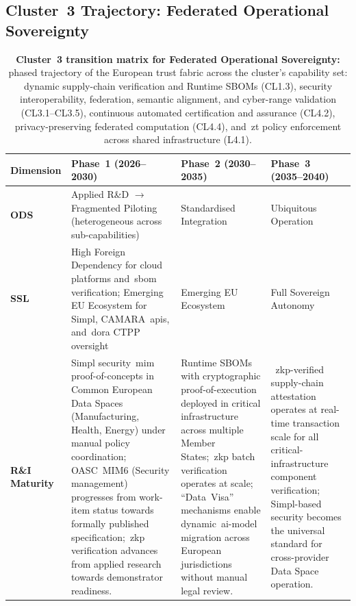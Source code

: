 \documentclass{ieeeaccess}
\begin{document}
\subsection{Cluster~3 Trajectory: Federated Operational Sovereignty}
\label{subsec:c3traj}

\begin{table}[ht!]
\caption{\textbf{Cluster~3 transition matrix for Federated Operational Sovereignty:} phased trajectory of the European trust fabric across the cluster's capability set: dynamic supply-chain verification and Runtime SBOMs (CL1.3), security interoperability, federation, semantic alignment, and cyber-range validation (CL3.1--CL3.5), continuous automated certification and assurance (CL4.2), privacy-preserving federated computation (CL4.4), and~\gls{zt} policy enforcement across shared infrastructure (L4.1).}
\label{tab:c3}
\centering
\footnotesize
\renewcommand{\arraystretch}{1.15}
\begin{tabularx}{\textwidth}{@{}>{\bfseries}p{} X X X@{}}
\toprule
\textbf{Dimension} & \textbf{Phase~1 (2026--2030)} & \textbf{Phase~2 (2030--2035)} & \textbf{Phase~3 (2035--2040)} \\
\midrule
ODS &
Applied R\&D $\rightarrow$ Fragmented Piloting (heterogeneous across sub-capabilities) &
Standardised Integration &
Ubiquitous Operation \\
\addlinespace[2pt]
SSL &
High Foreign Dependency for cloud platforms and~\gls{sbom} verification; Emerging EU Ecosystem for Simpl, CAMARA~\glspl{api}, and~\gls{dora} CTPP oversight &
Emerging EU Ecosystem &
Full Sovereign Autonomy \\
\midrule
R\&I Maturity &
Simpl security~\gls{mim} proof-of-concepts in Common European Data Spaces (Manufacturing, Health, Energy) under manual policy coordination; OASC~MIM6 (Security management) progresses from work-item status towards formally published specification;~\gls{zkp} verification advances from applied research towards demonstrator readiness. &
Runtime SBOMs with cryptographic proof-of-execution deployed in critical infrastructure across multiple Member States;~\gls{zkp} batch verification operates at scale; ``Data~Visa'' mechanisms enable dynamic~\gls{ai}-model migration across European jurisdictions without manual legal review. &
~\acrshort{zkp}-verified supply-chain attestation operates at real-time transaction scale for all critical-infrastructure component verification; Simpl-based security becomes the universal standard for cross-provider Data Space operation. \\

\end{tabularx}
\end{table}
\end{document}
